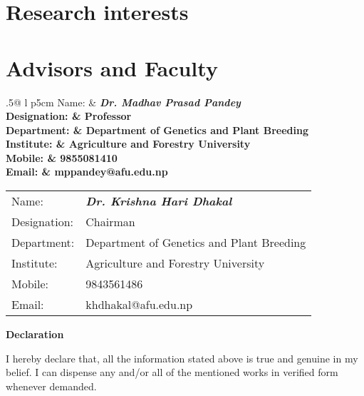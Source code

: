 \documentclass[11pt,a4paper,sans]{moderncv}
\makeatletter
\newcommand{\recommendation}[6]{%
  \noindent
  \begin{tabularx}{.5\linewidth}{@{\extracolsep{2pt}} l p{5cm} }
    Name: & \bfseries\textit{#1} \\
    Designation: & #2 \\
    Department: & #3 \\
    Institute: & #4 \\
    Mobile: & #5 \\
    Email: & #6 %
  \end{tabularx}%
}
\makeatother
\begin{document}
\section{Research interests}

\section{Advisors and Faculty}
\recommendation{Dr. Madhav Prasad Pandey}
    {Professor}
    {Department of Genetics and Plant Breeding}
    {Agriculture and Forestry University}
    {9855081410} %
    {mppandey@afu.edu.np} %
  \recommendation{Dr. Krishna Hari Dhakal}
    {Chairman}
    {Department of Genetics and Plant Breeding}
    {Agriculture and Forestry University}
    {9843561486}
    {khdhakal@afu.edu.np}

\vspace{2cm}
\parbox[t]{\textwidth}{
{\bfseries Declaration}\par

I hereby declare that, all the information stated above is true and genuine in my belief. I can dispense any and/or all of the mentioned works in verified form whenever demanded.
}

\nocite{*}

\end{document}
